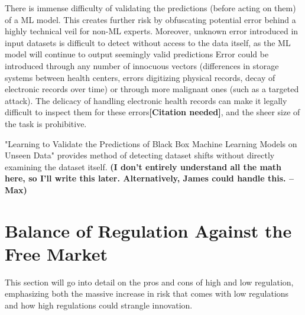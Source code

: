 \documentclass[]{article}
\begin{document}
		There is immense difficulty of validating the predictions (before acting on them) of a ML model. This creates further risk by obfuscating potential error behind a highly technical veil for non-ML experts. Moreover, unknown error introduced in input datasets is difficult to detect without access to the data itself, as the ML model will continue to output seemingly valid predictions\cite{10.1145/3328519.3329126} Error could be introduced through any number of innocuous vectors (differences in storage systems between health centers, errors digitizing physical records, decay of electronic records over time) or through more malignant ones (such as a targeted attack). The delicacy of handling electronic health records can make it legally difficult to inspect them for these errors\textbf{[Citation needed]}, and the sheer size of the task is prohibitive.

		"Learning to Validate the Predictions of Black Box Machine Learning Models on Unseen Data"\cite{10.1145/3328519.3329126} provides method of detecting dataset shifts without directly examining the dataset itself. \textbf{(I don't entirely understand all the math here, so I'll write this later. Alternatively, James could handle this. --Max)}

	\section{Balance of Regulation Against the Free Market}
		This section will go into detail on the pros and cons of high and low regulation, emphasizing both the massive increase in risk that comes with low regulations and how high regulations could strangle innovation.

\medskip



		
\end{document}
